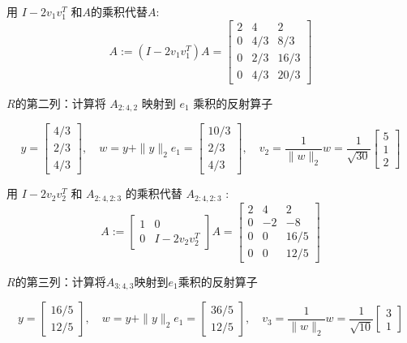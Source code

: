 \begin{problem}
用 $I-2 v_{1} v_{1}^{T}$ 和$A$的乘积代替$A$:
$$
A:=\left(I-2 v_{1} v_{1}^{T}\right) A=\left[\begin{array}{ccc}
2 & 4 & 2 \\
0 & 4 / 3 & 8 / 3 \\
0 & 2 / 3 & 16 / 3 \\
0 & 4 / 3 & 20 / 3
\end{array}\right]
$$

$R$的第二列：计算将 $ A_{2: 4,2} $ 映射到 $ e_{1} $ 乘积的反射算子

$$y=\left[\begin{array}{l}
    4 / 3 \\
    2 / 3 \\
    4 / 3
    \end{array}\right], \quad w=y+\|y\|_{2} e_{1}=\left[\begin{array}{r}
    10 / 3 \\
    2 / 3 \\
    4 / 3
    \end{array}\right], \quad v_{2}=\frac{1}{\|w\|_{2}} w=\frac{1}{\sqrt{30}}\left[\begin{array}{l}
    5 \\
    1 \\
    2
    \end{array}\right]
$$

用 $I-2 v_{2} v_{2}^{T}$ 和 $A_{2: 4,2: 3}$ 的乘积代替 $A_{2: 4,2: 3}$ :
$$
A:=\left[\begin{array}{cc}
1 & 0 \\
0 & I-2 v_{2} v_{2}^{T}
\end{array}\right] A=\left[\begin{array}{rrr}
2 & 4 & 2 \\
0 & -2 & -8 \\
0 & 0 & 16 / 5 \\
0 & 0 & 12 / 5
\end{array}\right]
$$

$R$的第三列：计算将$ A_{3: 4,3} $映射到$e_1$乘积的反射算子

$$y=\left[\begin{array}{l}
    16 / 5 \\
    12 / 5
    \end{array}\right], \quad w=y+\|y\|_{2} e_{1}=\left[\begin{array}{c}
    36 / 5 \\
    12 / 5
    \end{array}\right], \quad v_{3}=\frac{1}{\|w\|_{2}} w=\frac{1}{\sqrt{10}}\left[\begin{array}{l}
    3 \\
    1
    \end{array}\right]
$$


\end{problem}
